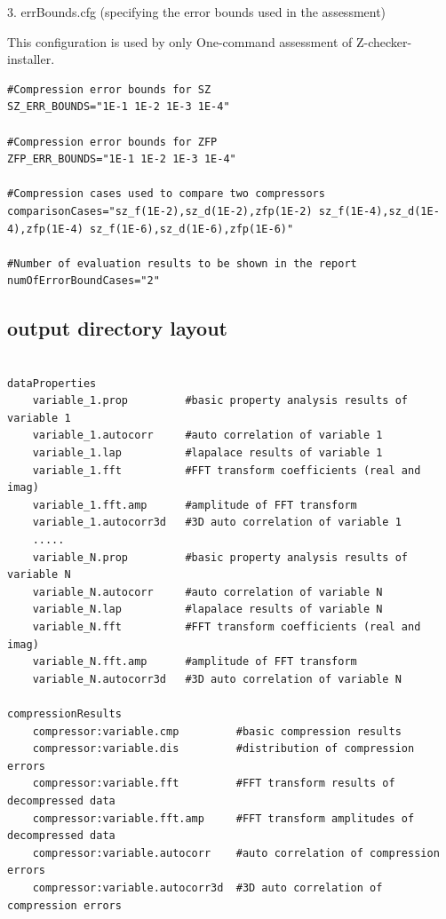 3. errBounds.cfg (specifying the error bounds used in the assessment)

This configuration is used by only One-command assessment of Z-checker-installer.
\begin{lstlisting}[style=ShellStyleInline, basicstyle =\footnotesize\ttfamily]
#Compression error bounds for SZ
SZ_ERR_BOUNDS="1E-1 1E-2 1E-3 1E-4"

#Compression error bounds for ZFP
ZFP_ERR_BOUNDS="1E-1 1E-2 1E-3 1E-4"

#Compression cases used to compare two compressors
comparisonCases="sz_f(1E-2),sz_d(1E-2),zfp(1E-2) sz_f(1E-4),sz_d(1E-4),zfp(1E-4) sz_f(1E-6),sz_d(1E-6),zfp(1E-6)"

#Number of evaluation results to be shown in the report
numOfErrorBoundCases="2"
\end{lstlisting}

\subsection{output directory layout}

\begin{lstlisting}[style=ShellStyleInline, basicstyle =\footnotesize\ttfamily]

dataProperties
    variable_1.prop         #basic property analysis results of variable 1
    variable_1.autocorr     #auto correlation of variable 1
    variable_1.lap          #lapalace results of variable 1
    variable_1.fft          #FFT transform coefficients (real and imag)
    variable_1.fft.amp      #amplitude of FFT transform
    variable_1.autocorr3d   #3D auto correlation of variable 1
    .....
    variable_N.prop         #basic property analysis results of variable N
    variable_N.autocorr     #auto correlation of variable N
    variable_N.lap          #lapalace results of variable N
    variable_N.fft          #FFT transform coefficients (real and imag)
    variable_N.fft.amp      #amplitude of FFT transform
    variable_N.autocorr3d   #3D auto correlation of variable N

compressionResults
    compressor:variable.cmp         #basic compression results
    compressor:variable.dis         #distribution of compression errors
    compressor:variable.fft         #FFT transform results of decompressed data
    compressor:variable.fft.amp     #FFT transform amplitudes of decompressed data
    compressor:variable.autocorr    #auto correlation of compression errors
    compressor:variable.autocorr3d  #3D auto correlation of compression errors
\end{lstlisting}

